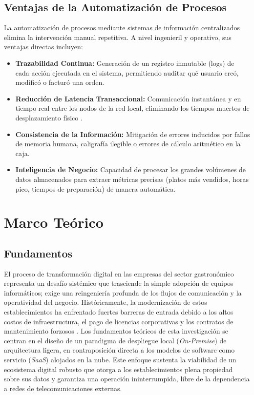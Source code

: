 \subsection{Ventajas de la Automatización de Procesos}
La automatización de procesos mediante sistemas de información centralizados elimina la intervención manual repetitiva. A nivel ingenieril y operativo, sus ventajas directas incluyen:
\begin{itemize}
	\item \textbf{Trazabilidad Continua:} Generación de un registro inmutable (logs) de cada acción ejecutada en el sistema, permitiendo auditar qué usuario creó, modificó o facturó una orden.
	\item \textbf{Reducción de Latencia Transaccional:} Comunicación instantánea y en tiempo real entre los nodos de la red local, eliminando los tiempos muertos de desplazamiento físico \cite{DEVRIES201859}.
	\item \textbf{Consistencia de la Información:} Mitigación de errores inducidos por fallos de memoria humana, caligrafía ilegible o errores de cálculo aritmético en la caja.
	\item \textbf{Inteligencia de Negocio:} Capacidad de procesar los grandes volúmenes de datos almacenados para extraer métricas precisas (platos más vendidos, horas pico, tiempos de preparación) de manera automática.
\end{itemize}


\section{Marco Teórico}

\subsection{Fundamentos}
El proceso de transformación digital en las empresas del sector gastronómico representa un desafío sistémico que trasciende la simple adopción de equipos informáticos; exige una reingeniería profunda de los flujos de comunicación y la operatividad del negocio. Históricamente, la modernización de estos establecimientos ha enfrentado fuertes barreras de entrada debido a los altos costos de infraestructura, el pago de licencias corporativas y los contratos de mantenimiento forzosos \cite{marcelo2024desafios}. Los fundamentos teóricos de esta investigación se centran en el diseño de un paradigma de despliegue local (\textit{On-Premise}) de arquitectura ligera, en contraposición directa a los modelos de software como servicio (\textit{SaaS}) alojados en la nube. Este enfoque sustenta la viabilidad de un ecosistema digital robusto que otorga a los establecimientos plena propiedad sobre sus datos y garantiza una operación ininterrumpida, libre de la dependencia a redes de telecomunicaciones externas.


